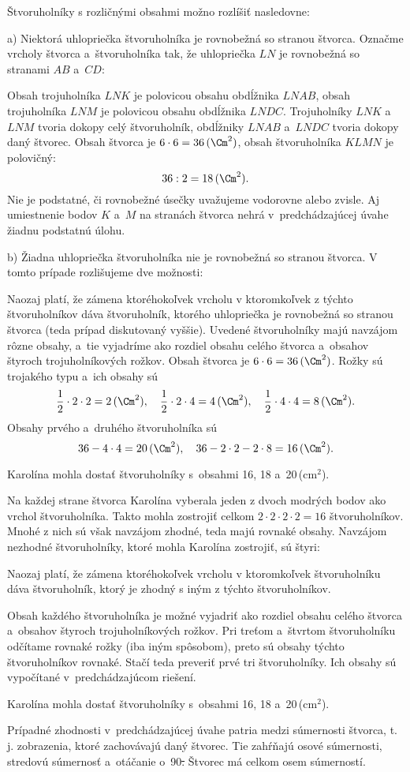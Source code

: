 {%
Štvoruholníky s rozličnými obsahmi možno rozlíšiť nasledovne:

\smallskip
a) Niektorá uhlopriečka štvoruholníka je rovnobežná so stranou štvorca.
Označme vrcholy štvorca a~štvoruholníka tak, že uhlopriečka $LN$ je rovnobežná so stranami $AB$ a~$CD$:
%


\noindent
Obsah trojuholníka $LNK$ je polovicou obsahu obdĺžnika $LNAB$, obsah trojuholníka $LNM$ je polovicou obsahu obdĺžnika $LNDC$.
Trojuholníky $LNK$ a~$LNM$ tvoria dokopy celý štvoruholník, obdĺžniky $LNAB$ a~$LNDC$ tvoria dokopy daný štvorec.
Obsah štvorca je $6\cdot6=36\,(\Cm^2)$, obsah štvoruholníka $KLMN$ je polovičný:
$$
36:2=18\,(\Cm^2).
$$
Nie je podstatné, či rovnobežné úsečky uvažujeme vodorovne alebo zvisle.
Aj umiestnenie bodov $K$ a~$M$ na stranách štvorca nehrá v~predchádzajúcej úvahe žiadnu podstatnú úlohu.

\smallskip
b) Žiadna uhlopriečka štvoruholníka nie je rovnobežná so stranou štvorca.
V tomto prípade rozlišujeme dve možnosti:
%


\noindent
Naozaj platí, že zámena ktoréhokoľvek vrcholu v ktoromkoľvek z týchto štvoruholníkov dáva štvoruholník, ktorého uhlopriečka je rovnobežná so stranou štvorca (teda prípad diskutovaný vyššie).
Uvedené štvoruholníky majú navzájom rôzne obsahy, a~tie vyjadríme ako rozdiel obsahu celého štvorca a~obsahov štyroch trojuholníkových rožkov.
Obsah štvorca je $6\cdot6=36\,(\Cm^2)$.
Rožky sú trojakého typu a~ich obsahy sú
$$
\frac12\cdot2\cdot2=2\,(\Cm^2),\quad
\frac12\cdot2\cdot4=4\,(\Cm^2),\quad
\frac12\cdot4\cdot4=8\,(\Cm^2).
$$
Obsahy prvého a~druhého štvoruholníka sú
$$
36-4\cdot4 =20\,(\Cm^2),\quad
36-2\cdot2-2\cdot8 =16\,(\Cm^2).
$$

\smallskip
Karolína mohla dostať štvoruholníky s~obsahmi 16, 18 a~20\,(cm$^2$).

\ineriesenie
Na každej strane štvorca Karolína vyberala jeden z dvoch modrých bodov ako vrchol štvoruholníka.
Takto mohla zostrojiť celkom $2\cdot2\cdot2\cdot2=16$ štvoruholníkov.
Mnohé z nich sú však navzájom zhodné, teda majú rovnaké obsahy.
Navzájom nezhodné štvoruholníky, ktoré mohla Karolína zostrojiť, sú štyri:
%


\noindent
Naozaj platí, že zámena ktoréhokoľvek vrcholu v ktoromkoľvek štvoruholníku dáva štvoruholník, ktorý je zhodný s iným z týchto štvoruholníkov.

Obsah každého štvoruholníka je možné vyjadriť ako rozdiel obsahu celého štvorca a~obsahov štyroch trojuholníkových rožkov.
Pri treťom a~štvrtom štvoruholníku odčítame rovnaké rožky (iba iným spôsobom), preto sú obsahy týchto štvoruholníkov rovnaké.
Stačí teda preveriť prvé tri štvoruholníky.
Ich obsahy sú vypočítané v~predchádzajúcom riešení.

Karolína mohla dostať štvoruholníky s~obsahmi 16, 18 a~20\,(cm$^2$).

\poznamky
Prípadné zhodnosti v~predchádzajúcej úvahe patria medzi súmernosti štvorca, t.\,j. zobrazenia, ktoré zachovávajú daný štvorec.
Tie zahŕňajú osové súmernosti, stredovú súmernosť a~otáčanie o~90\st.
Štvorec má celkom osem súmerností.
}

